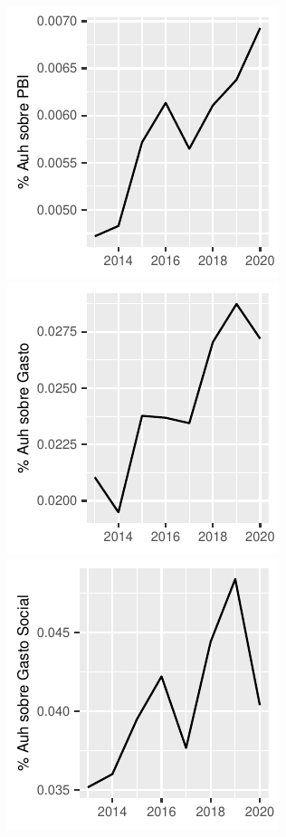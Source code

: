 \documentclass[
  12,
]{article}
\begin{document}
\includegraphics{Grupo4_Final_files/figure-latex/graficos_presu_1-1.pdf}
\includegraphics{Grupo4_Final_files/figure-latex/graficos_presu_1-2.pdf}
\includegraphics{Grupo4_Final_files/figure-latex/graficos_presu_1-3.pdf}
\end{document}
